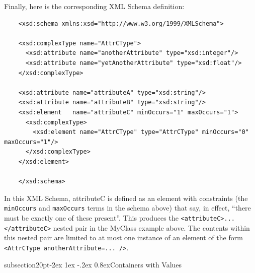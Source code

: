 \documentclass[10pt]{article}
\makeatletter
\renewcommand{\subsection}{\@startsection%
  {subsection}{2}{0pt}{-2ex \@plus 1ex \@minus -.2ex}%
  {0.8ex}{\slshape\large\bfseries}}
\newcommand{\tightspacing}{\renewcommand{\baselinestretch}{0.85}}
\newcommand{\regularspacing}{\renewcommand{\baselinestretch}{1.0}}
\newcommand{\class}[1]{\textsf{#1}}
\newcommand{\attrib}[1]{\textsf{#1}}
\makeatother
\begin{document}
Finally, here is the corresponding XML Schema definition:
\begin{small}
  \tightspacing
\begin{verbatim}
    <xsd:schema xmlns:xsd="http://www.w3.org/1999/XMLSchema">
    
    <xsd:complexType name="AttrCType">
      <xsd:attribute name="anotherAttribute" type="xsd:integer"/>
      <xsd:attribute name="yetAnotherAttribute" type="xsd:float"/>
    </xsd:complexType>
    
    <xsd:attribute name="attributeA" type="xsd:string"/>
    <xsd:attribute name="attributeB" type="xsd:string"/>
    <xsd:element   name="attributeC" minOccurs="1" maxOccurs="1">
      <xsd:complexType>
        <xsd:element name="AttrCType" type="AttrCType" minOccurs="0" maxOccurs="1"/>
      </xsd:complexType>
    </xsd:element>
    
    </xsd:schema>
\end{verbatim}
  \regularspacing
\end{small}
In this XML Schema, \attrib{attributeC} is defined as an element with
constraints (the \verb|minOccurs| and \verb|maxOccurs| terms in the schema
above) that say, in effect, ``there must be exactly one of these present''.
This produces the \verb|<attributeC>...</attributeC>| nested pair in the
\class{MyClass} example above.  The contents within this nested pair are
limited to at most one instance of an element of the form
\verb|<AttrCType anotherAttribute=... />|.


\subsection{Containers with Values}
\end{document}
